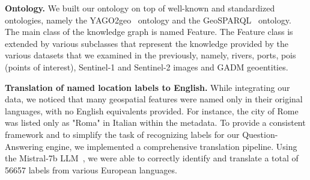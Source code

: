 \textbf{Ontology.} We built our ontology on top of well-known and standardized ontologies, namely the YAGO2geo~\cite{DBLP:conf/semweb/KaralisMK19}
ontology and the GeoSPARQL~\cite{perry2012ogc} ontology. The main class of the knowledge graph is named Feature. The Feature class is extended by various subclasses that represent the knowledge provided by the various datasets that we examined in the previously, namely, rivers,
ports, pois (points of interest), Sentinel-1 and Sentinel-2 images and GADM geoentities. 


\textbf{Translation of named location labels to English.} While integrating our data, we noticed that many
geospatial features were named only in their original languages, with no English equivalents provided. For
instance, the city of Rome was listed only as "Roma" in Italian within the metadata. To provide a consistent framework and to simplify the task of recognizing labels for our Question-Answering engine, we implemented a comprehensive translation pipeline. Using the Mistral-7b LLM~\cite{mistral}, we were able to correctly identify and translate a total of 56657 labels from various European languages.